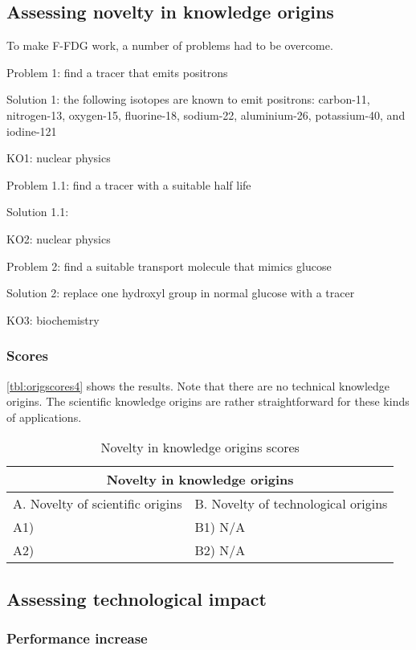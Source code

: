 \subsection{Assessing novelty in knowledge origins}
To make F-FDG work, a number of problems had to be overcome.

Problem 1: find a tracer that emits positrons

Solution 1: the following isotopes are known to emit positrons:  carbon-11,
nitrogen-13, oxygen-15, fluorine-18, sodium-22, aluminium-26, potassium-40, 
and iodine-121

KO1: nuclear physics

Problem 1.1: find a tracer with a suitable half life

Solution 1.1: 

KO2: nuclear physics

Problem 2: find a suitable transport molecule that mimics glucose

Solution 2: replace one hydroxyl group in normal glucose with a tracer 

KO3: biochemistry


\subsubsection{Scores}
\autoref{tbl:origscores4} shows the results. Note that there are no technical
knowledge origins. The scientific knowledge origins are rather straightforward
for these kinds of applications.

\begin{table}[h]
\centering
\begin{tabular}{l l}
\hline
\multicolumn{2}{|c|}{Novelty in knowledge origins} \\
\hline
A. Novelty of scientific origins & B. Novelty of technological origins\\
A1) & B1) N/A\\ 
A2) & B2) N/A\\ 
\hline
\end{tabular}
\caption{Novelty in knowledge origins scores}
\label{tbl:origscores4}
\end{table}

\subsection{Assessing technological impact}
\subsubsection{Performance increase}


